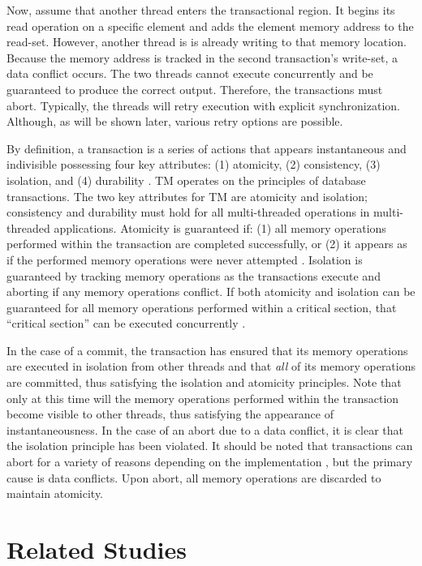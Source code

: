 \documentclass[11pt]{book}
\begin{document}
Now, assume that another thread enters the transactional region.  It begins its read
operation on a specific element and adds the element memory address to the read-set.
However, another thread is is already writing to that memory location.  Because the memory
address is tracked in the second transaction's write-set, a data conflict occurs.  The two
threads cannot execute concurrently and be guaranteed to produce the correct output.
Therefore, the transactions must abort.  Typically, the threads will retry execution with
explicit synchronization.  Although, as will be shown later, various retry options are
possible. 

By definition, a transaction is a series of actions that appears instantaneous and
indivisible possessing four key attributes: (1) atomicity, (2) consistency, (3) isolation,
and (4) durability \cite{tm_2nd}.  TM operates on the principles of database transactions.
The two key attributes for TM are atomicity and isolation; consistency and durability must
hold for all multi-threaded operations in multi-threaded applications.  Atomicity is
guaranteed if: (1) all memory operations performed within the transaction are completed
successfully, or (2) it appears as if the performed memory operations were never attempted
\cite{tm_2nd}.  Isolation is guaranteed by tracking memory operations as the transactions
execute and aborting if any memory operations conflict.  If both atomicity and isolation
can be guaranteed for all memory operations performed within a critical section, that
``critical section'' can be executed concurrently \cite{sle_rajwar}.

In the case of a commit, the transaction has ensured that its memory operations are
executed in isolation from other threads and that \emph{all} of its memory operations are
committed, thus satisfying the isolation and atomicity principles.  Note that only at this
time will the memory operations performed within the transaction become visible to other
threads, thus satisfying the appearance of instantaneousness.  In the case of an abort due
to a data conflict, it is clear that the isolation principle has been violated.  It should
be noted that transactions can abort for a variety of reasons depending on the
implementation \cite{intel_opt_man,chung_amd}, but the primary cause is data conflicts.
Upon abort, all memory operations are discarded to maintain atomicity.

\section{Related Studies}
\end{document}
